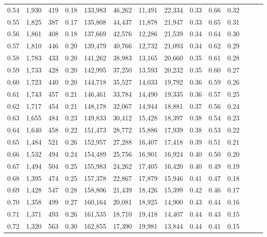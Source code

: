 \begin{tabular}{rrrrrrrrrrrrrr}
0.54 &  1,930 &  419 &  0.18 &  133,983 &   46,262 &  11,491 &  22,334 &  0.33 &  0.66 &      0.32 \\
0.55 &  1,825 &  387 &  0.17 &  135,808 &   44,437 &  11,878 &  21,947 &  0.33 &  0.65 &      0.31 \\
0.56 &  1,861 &  408 &  0.18 &  137,669 &   42,576 &  12,286 &  21,539 &  0.34 &  0.64 &      0.30 \\
0.57 &  1,810 &  446 &  0.20 &  139,479 &   40,766 &  12,732 &  21,093 &  0.34 &  0.62 &      0.29 \\
0.58 &  1,783 &  433 &  0.20 &  141,262 &   38,983 &  13,165 &  20,660 &  0.35 &  0.61 &      0.28 \\
0.59 &  1,733 &  428 &  0.20 &  142,995 &   37,250 &  13,593 &  20,232 &  0.35 &  0.60 &      0.27 \\
0.60 &  1,723 &  440 &  0.20 &  144,718 &   35,527 &  14,033 &  19,792 &  0.36 &  0.59 &      0.26 \\
0.61 &  1,743 &  457 &  0.21 &  146,461 &   33,784 &  14,490 &  19,335 &  0.36 &  0.57 &      0.25 \\
0.62 &  1,717 &  454 &  0.21 &  148,178 &   32,067 &  14,944 &  18,881 &  0.37 &  0.56 &      0.24 \\
0.63 &  1,655 &  484 &  0.23 &  149,833 &   30,412 &  15,428 &  18,397 &  0.38 &  0.54 &      0.23 \\
0.64 &  1,640 &  458 &  0.22 &  151,473 &   28,772 &  15,886 &  17,939 &  0.38 &  0.53 &      0.22 \\
0.65 &  1,484 &  521 &  0.26 &  152,957 &   27,288 &  16,407 &  17,418 &  0.39 &  0.51 &      0.21 \\
0.66 &  1,532 &  494 &  0.24 &  154,489 &   25,756 &  16,901 &  16,924 &  0.40 &  0.50 &      0.20 \\
0.67 &  1,494 &  504 &  0.25 &  155,983 &   24,262 &  17,405 &  16,420 &  0.40 &  0.49 &      0.19 \\
0.68 &  1,395 &  474 &  0.25 &  157,378 &   22,867 &  17,879 &  15,946 &  0.41 &  0.47 &      0.18 \\
0.69 &  1,428 &  547 &  0.28 &  158,806 &   21,439 &  18,426 &  15,399 &  0.42 &  0.46 &      0.17 \\
0.70 &  1,358 &  499 &  0.27 &  160,164 &   20,081 &  18,925 &  14,900 &  0.43 &  0.44 &      0.16 \\
0.71 &  1,371 &  493 &  0.26 &  161,535 &   18,710 &  19,418 &  14,407 &  0.44 &  0.43 &      0.15 \\
0.72 &  1,320 &  563 &  0.30 &  162,855 &   17,390 &  19,981 &  13,844 &  0.44 &  0.41 &      0.15 \\

\end{tabular}
